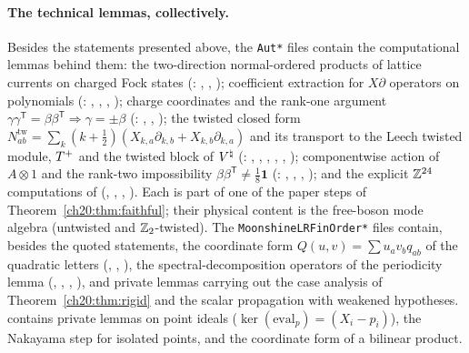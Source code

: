 \paragraph{The technical lemmas, collectively.}  Besides the statements presented above, the \texttt{Aut*} files contain the
computational lemmas behind them: the two-direction normal-ordered products of lattice currents on charged Fock states
(: , , ); coefficient
extraction for $X\partial$ operators on polynomials (: , ,
, ); charge coordinates and the rank-one argument $\gamma\gamma^{\mathsf T}=\beta\beta^{\mathsf T}
\Rightarrow\gamma=\pm\beta$ (: , ,
); the twisted closed form $N^{\mathrm{tw}}_{ab}=\sum_k(k+\tfrac12)(X_{k,a}\partial_{k,b}+X_{k,b}\partial_{k,a})$ and its
transport to the Leech twisted module, $T^{+}$ and the twisted block of ${V^{\natural}}$ (:
, , , , ,
); componentwise action of $A\otimes1$ and the rank-two impossibility
$\beta\beta^{\mathsf T}\ne\tfrac18\mathbf 1$ (: ,
, , ); and the explicit ${\mathbb{Z}}^{24}$ computations of
 (, , , ).
Each is part of one of the paper steps of Theorem~\ref{ch20:thm:faithful}; their physical content is the free-boson mode
algebra (untwisted and ${\mathbb{Z}}_2$-twisted).  The \texttt{MoonshineLRFinOrder*} files contain, besides the quoted statements, the
coordinate form $Q(u,v)=\sum u_av_bq_{ab}$ of the quadratic letters (, ,
), the spectral-decomposition operators of the periodicity lemma (,
, , ), and private lemmas carrying out the case analysis
of Theorem~\ref{ch20:thm:rigid} and the scalar propagation with weakened hypotheses.  
contains private lemmas on point ideals ($\ker(\mathrm{eval}_p)=(X_i-p_i)$), the Nakayama step for isolated points, and the
coordinate form of a bilinear product.

